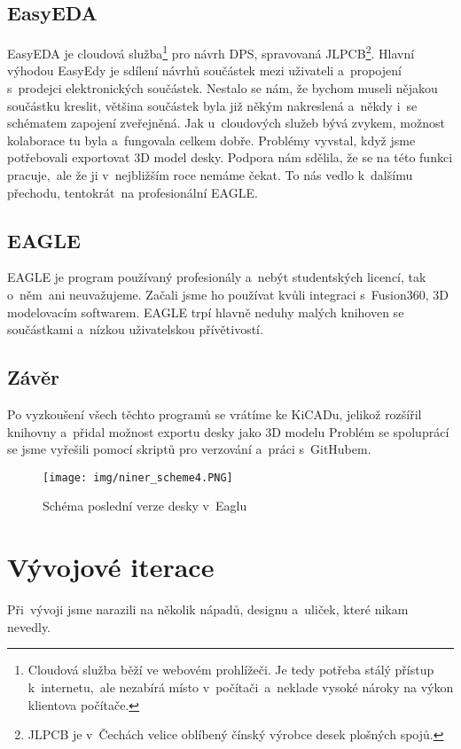 \subsection{EasyEDA}
EasyEDA je cloudová služba\footnote{Cloudová služba běží ve webovém prohlížeči. Je tedy potřeba stálý přístup k~internetu,~ale nezabírá místo v~počítači~a~neklade vysoké nároky na výkon klientova počítače.} pro návrh DPS, spravovaná JLPCB\footnote{JLPCB je v~Čechách velice oblíbený čínský výrobce desek plošných spojů.}. Hlavní výhodou EasyEdy je sdílení návrhů součástek mezi uživateli a~propojení s~prodejci elektronických součástek. Nestalo se nám, že bychom museli nějakou součástku kreslit, většina součástek byla již někým nakreslená a~někdy i~se schématem zapojení zveřejněná. Jak u~cloudových služeb bývá zvykem, možnost kolaborace tu byla a~fungovala celkem dobře. Problémy vyvstal, když jsme potřebovali exportovat 3D model desky. Podpora nám sdělila, že se na této funkci pracuje,~ale že ji v~nejbližším roce nemáme čekat. To nás vedlo k~dalšímu přechodu, tentokrát~na profesionální EAGLE.

\subsection{EAGLE}
EAGLE je program používaný profesionály a~nebýt studentských licencí, tak o~něm~ani neuvažujeme. Začali jsme ho používat kvůli integraci s~Fusion360, 3D modelovacím softwarem. EAGLE trpí hlavně neduhy malých knihoven se součástkami a~nízkou uživatelskou přívětivostí.

\subsection{Závěr}
Po vyzkoušení všech těchto programů se vrátíme ke KiCADu, jelikož rozšířil knihovny a~přidal možnost exportu desky jako 3D modelu Problém se spoluprácí se jsme  vyřešili pomocí skriptů pro verzování a~práci s~GitHubem.

\begin{figure}[H]
    \centering
    \texttt{[image: img/niner\_scheme4.PNG]}
    \caption{Schéma poslední verze desky v~Eaglu}
\end{figure}
\newpage

\section{Vývojové iterace}
Při~vývoji jsme narazili na několik nápadů, designu a~uliček, které nikam nevedly.

